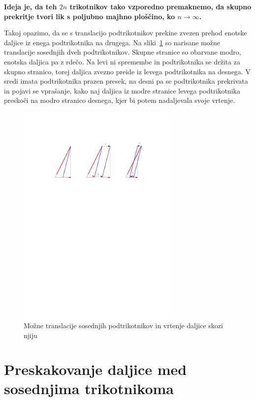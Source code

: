 \documentclass[a4paper, 12pt]{article}
\begin{document}
\textbf{Ideja je, da teh $ 2n $ trikotnikov tako vzporedno premaknemo, da skupno prekritje tvori lik s poljubno majhno ploščino, ko $ n \to \infty $.}

Takoj opazimo, da se s translacijo podtrikotnikov prekine zvezen prehod enotske daljice iz enega podtrikotnika na drugega. Na sliki~\ref{preskok1} so narisane možne translacije sosednjih dveh podtrikotnikov. Skupne stranice so obarvane modro, enotska daljica pa z rdečo. Na levi ni spremembe in podtrikotnika se držita za skupno stranico, torej daljica zvezno preide iz levega podtrikotnika na desnega. V sredi imata podtrikotnika prazen presek, na desni pa se podtrikotnika prekrivata in pojavi se vprašanje, kako naj daljica iz modre stranice levega podtrikotnika preskoči na modro stranico desnega, kjer bi potem nadaljevala svoje vrtenje.

\begin{figure}[h!]
    \centering
    \includegraphics[width=0.7\textwidth]{ipe_slike/preskok1.pdf}
    \caption{Možne translacije sosednjih podtrikotnikov in vrtenje daljice skozi njiju}
    \label{preskok1}
\end{figure}


\section*{Preskakovanje daljice med sosednjima trikotnikoma}
\end{document}
